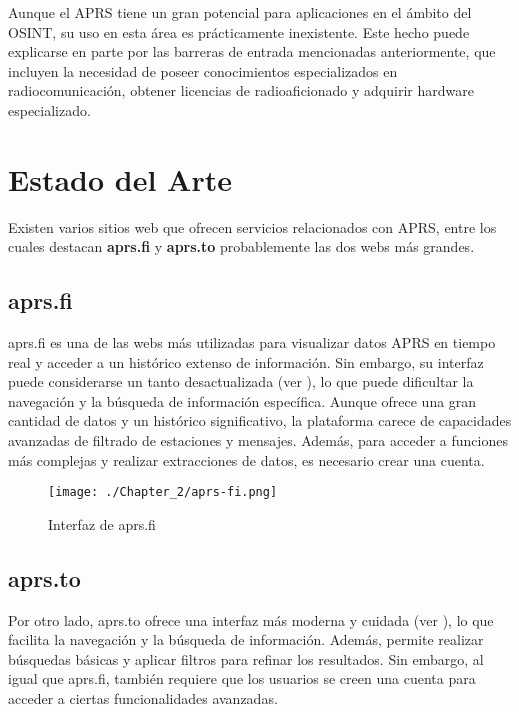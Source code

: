 Aunque el APRS tiene un gran potencial para aplicaciones en el ámbito del OSINT, su uso en esta área es prácticamente inexistente. Este hecho puede explicarse en parte por las barreras de entrada mencionadas anteriormente, que incluyen la necesidad de poseer conocimientos especializados en radiocomunicación, obtener licencias de radioaficionado y adquirir hardware especializado.

\section{Estado del Arte}

Existen varios sitios web que ofrecen servicios relacionados con APRS, entre los cuales destacan \textbf{aprs.fi} y \textbf{aprs.to} probablemente las dos webs más grandes.

\subsection{aprs.fi}

aprs.fi es una de las webs más utilizadas para visualizar datos APRS en tiempo real y acceder a un histórico extenso de información. Sin embargo, su interfaz puede considerarse un tanto desactualizada (ver ), lo que puede dificultar la navegación y la búsqueda de información específica. Aunque ofrece una gran cantidad de datos y un histórico significativo, la plataforma carece de capacidades avanzadas de filtrado de estaciones y mensajes. Además, para acceder a funciones más complejas y realizar extracciones de datos, es necesario crear una cuenta.

\begin{figure}[h]
    \centering
    \texttt{[image: ./Chapter\_2/aprs-fi.png]}
    \caption{Interfaz de aprs.fi}
    \label{fig:aprs-fi}
\end{figure}

\subsection{aprs.to}

Por otro lado, aprs.to ofrece una interfaz más moderna y cuidada (ver ), lo que facilita la navegación y la búsqueda de información. Además, permite realizar búsquedas básicas y aplicar filtros para refinar los resultados. Sin embargo, al igual que aprs.fi, también requiere que los usuarios se creen una cuenta para acceder a ciertas funcionalidades avanzadas.

